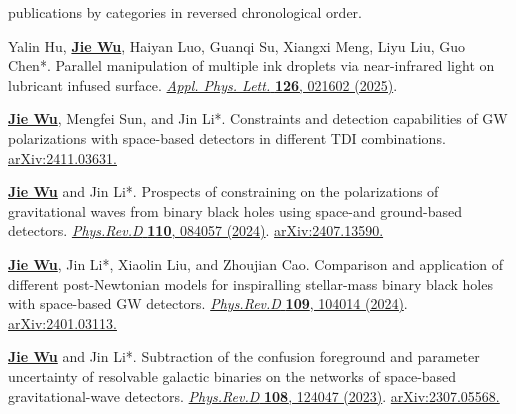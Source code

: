 


\begin{cvparagraph}
publications by categories in reversed chronological order.
\end{cvparagraph}

\begin{cvpublications}
\begin{pubitems} 
\item {Yalin Hu, \textbf{\underline{Jie Wu}}, Haiyan Luo, Guanqi Su, Xiangxi Meng, Liyu Liu, Guo Chen*. Parallel manipulation of multiple ink droplets via near-infrared light on lubricant infused surface. \href{https://pubs.aip.org/aip/apl/article/126/2/021602/3330590}{\textit{Appl. Phys. Lett.} \textbf{126}, 021602 (2025)}.}
\item {\textbf{\underline{Jie Wu}}, Mengfei Sun, and Jin Li*. Constraints and detection capabilities of GW polarizations with space-based detectors in different TDI combinations. \href{https://arxiv.org/abs/2411.03631}{arXiv:2411.03631.}}
\item {\textbf{\underline{Jie Wu}} and Jin Li*. Prospects of constraining on the polarizations of gravitational waves from binary black holes using space-and ground-based detectors. \href{https://journals.aps.org/prd/abstract/10.1103/PhysRevD.110.084057}{\textit{Phys.Rev.D} \textbf{110}, 084057 (2024)}. \href{https://arxiv.org/abs/2407.13590}{arXiv:2407.13590.}}
\item \textbf{\underline{Jie Wu}}, Jin Li*, Xiaolin Liu, and Zhoujian Cao. Comparison and application of different post-Newtonian models for inspiralling stellar-mass binary black holes with space-based GW detectors. \href{https://journals.aps.org/prd/abstract/10.1103/PhysRevD.109.104014}{\textit{Phys.Rev.D} \textbf{109}, 104014 (2024)}. \href{https://arxiv.org/abs/2401.03113}{arXiv:2401.03113.}

\item \textbf{\underline{Jie Wu}} and Jin Li*. Subtraction of the confusion foreground and parameter uncertainty of resolvable galactic binaries on the networks of space-based gravitational-wave detectors. \href{https://journals.aps.org/prd/abstract/10.1103/PhysRevD.108.124047}{\textit{Phys.Rev.D} \textbf{108}, 124047 (2023)}. \href{https://arxiv.org/abs/2307.05568}{arXiv:2307.05568.}


\end{pubitems}
\end{cvpublications}

